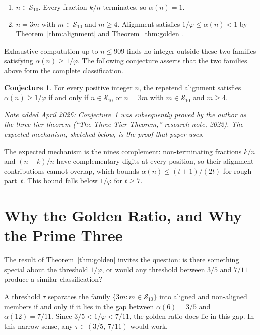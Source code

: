 \documentclass[12pt]{amsart}
\theoremstyle{definition}
\newtheorem{conjecture}[theorem]{Conjecture}
\theoremstyle{remark}
\begin{document}
\begin{enumerate}
\item[\textbf{Tier~1.}]
$n \in \mathcal{S}_{10}$. Every fraction $k/n$ terminates, so
$\alpha(n) = 1$.

\item[\textbf{Tier~2.}]
$n = 3m$ with $m \in \mathcal{S}_{10}$ and $m \ge 4$. Alignment
satisfies $1/\varphi \le \alpha(n) < 1$ by
Theorem~\ref{thm:alignment} and Theorem~\ref{thm:golden}.
\end{enumerate}

Exhaustive computation up to $n \le 909$ finds no integer outside
these two families satisfying $\alpha(n) \ge 1/\varphi$. The
following conjecture asserts that the two families above form the
complete classification.

\begin{conjecture}\label{conj:complete}
For every positive integer $n$, the repetend alignment satisfies
$\alpha(n) \ge 1/\varphi$ if and only if $n \in \mathcal{S}_{10}$
or $n = 3m$ with $m \in \mathcal{S}_{10}$ and $m \ge 4$.
\end{conjecture}

\emph{Note added April 2026: Conjecture~\ref{conj:complete} was
subsequently proved by the author as the three-tier theorem
(``The Three-Tier Theorem,'' research note, 2022). The expected
mechanism, sketched below, is the proof that paper uses.}

The expected mechanism is the nines complement: non-terminating
fractions $k/n$ and $(n{-}k)/n$ have complementary digits at every
position, so their alignment contributions cannot overlap, which
bounds $\alpha(n) \le (t{+}1)/(2t)$ for rough part~$t$. This bound
falls below $1/\varphi$ for $t \ge 7$.

\section{Why the Golden Ratio, and Why the Prime Three}

The result of Theorem~\ref{thm:golden} invites the question: is there
something special about the threshold $1/\varphi$, or would any
threshold between $3/5$ and $7/11$ produce a similar classification?

A threshold $\tau$ separates the family $\{3m : m \in \mathcal{S}_{10}\}$
into aligned and non-aligned members if and only if it lies in the gap
between $\alpha(6) = 3/5$ and $\alpha(12) = 7/11$. Since
$3/5 < 1/\varphi < 7/11$, the golden ratio does lie in this gap.
In this narrow sense, any $\tau \in (3/5,\, 7/11)$ would work.
\end{document}
